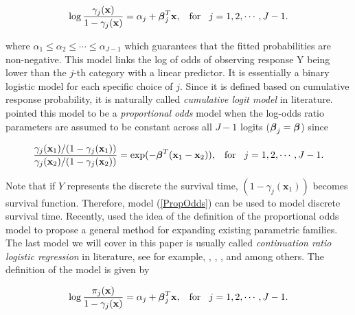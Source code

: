 \documentclass[12]{interact}
\theoremstyle{plain}%
\theoremstyle{definition}
\theoremstyle{remark}
\begin{document}
\begin{equation}
	\log \frac{\gamma_j(\mathbf{x})}{1-\gamma_j(\mathbf{x})}=\alpha_j +  {\mbox{\boldmath $\beta$}}_j^{T}\mathbf{x}, \hspace{3mm}\mbox{for}\hspace{3mm} j =1, 2, \cdots, J-1. \label{cumulativelogit}
\end{equation}

where $\alpha_1\le \alpha_2 \le \cdots \le \alpha_{J-1}$ which guarantees that the fitted probabilities are non-negative. This model links the log of odds of observing response Y being lower than the $j$-th category with a linear predictor. It is essentially a binary logistic model for each specific choice of $j$. Since it is defined based on cumulative response probability, it is naturally called {\em cumulative logit model} in literature. \cite{MCCULLAGH-OrdinalReg-Discussion-1980} pointed this model to be a {\em proportional odds} model when the log-odds ratio parameters are assumed to be constant across all $J-1$ logits (${\mbox{\boldmath $\beta$}}_j={\mbox{\boldmath $\beta$}}$) since

\begin{equation}
	\frac{\gamma_j(\mathbf{x}_1)/(1-\gamma_j(\mathbf{x}_1))}{\gamma_{j}(\mathbf{x}_2)/(1-\gamma_{j}(\mathbf{x}_2))}=
	\exp(-\mbox{\boldmath $\beta$}^{T}(\mathbf{x}_1-\mathbf{x}_2)), \hspace{3mm}\mbox{for}\hspace{3mm} j =1, 2, \cdots, J-1. \label{PropOdds}
\end{equation}

Note that if $Y$ represents the discrete the survival time, $(1-\gamma_j(\mathbf{x}_1))$ becomes survival function. Therefore, model (\ref{PropOdds}) can be used to model discrete survival time. Recently, \cite{Martshall-Olkin-1997} used the idea of the definition of the proportional odds model to propose a general method for expanding existing parametric families. The last model we will cover in this paper is usually called {\em continuation ratio logistic regression} in literature, see for example, \cite{Fienberg-book-1978}, \cite{MCCULLAGH-OrdinalReg-Discussion-1980}, \cite{Aggresti-CDA-2002}, and among others. The definition of the model is given by

\begin{equation}
	\log \frac{\pi_j(\mathbf{x})}{1-\gamma_j(\mathbf{x})}=\alpha_j +  {\mbox{\boldmath $\beta$}}_j^{T}\mathbf{x}, \hspace{3mm}\mbox{for}\hspace{3mm} j =1, 2, \cdots, J-1. \label{ContinuatioRatio}
\end{equation}
\end{document}
